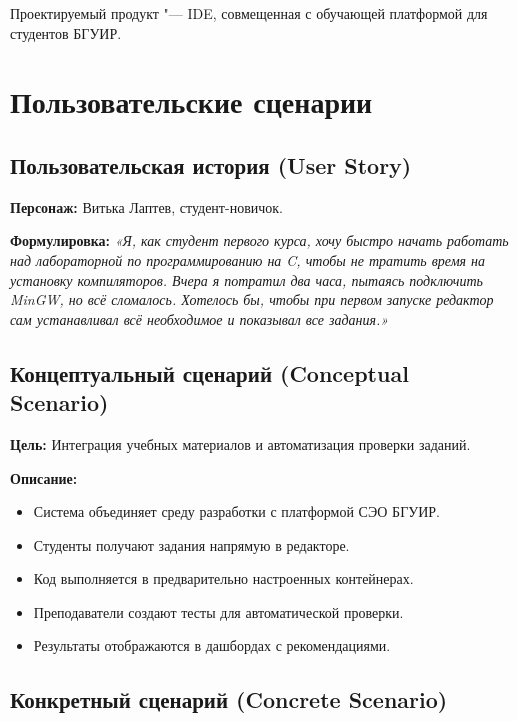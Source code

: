 \documentclass{bsuir}
\begin{document}
\maketitle
\mainmatter

Проектируемый продукт "--- IDE, совмещенная с обучающей платформой для студентов
БГУИР.

\section{Пользовательские сценарии}

\subsection*{Пользовательская история (User Story)}

\textbf{Персонаж:} Витька Лаптев, студент-новичок.

\textbf{Формулировка:}
\textit{«Я, как студент первого курса, хочу быстро начать работать над лабораторной по программированию на C, чтобы не тратить время на установку компиляторов. Вчера я потратил два часа, пытаясь подключить MinGW, но всё сломалось. Хотелось бы, чтобы при первом запуске редактор сам устанавливал всё необходимое и показывал все задания.»}

\subsection*{Концептуальный сценарий (Conceptual Scenario)}

\textbf{Цель:} Интеграция учебных материалов и автоматизация проверки заданий.

\textbf{Описание:}

\begin{itemize}
    \item Система объединяет среду разработки с платформой СЭО БГУИР.
    \item Студенты получают задания напрямую в редакторе.
    \item Код выполняется в предварительно настроенных контейнерах.
    \item Преподаватели создают тесты для автоматической проверки.
    \item Результаты отображаются в дашбордах с рекомендациями.
\end{itemize}

\subsection*{Конкретный сценарий (Concrete Scenario)}
\end{document}
